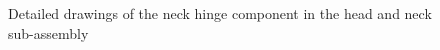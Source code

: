         \begin{figure}[H]
        \centering
        \caption[Detailed drawings of the neck hinge component in the head and neck sub-assembly]{Detailed drawings of the neck hinge component in the head and neck sub-assembly}
        \label{fig:mechDesign-neckHinge}
        \end{figure}
        
